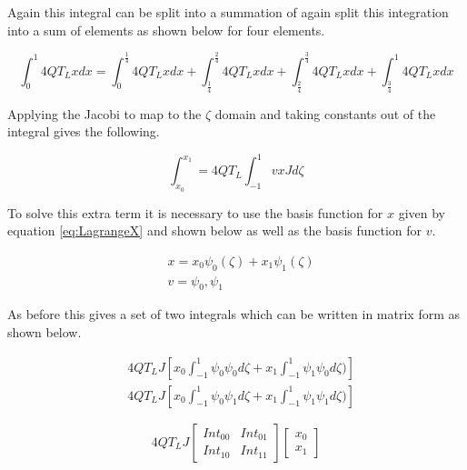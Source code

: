 \documentclass[11pt]{article}
\begin{document}
Again this integral can be split into a summation of  again split this integration into a sum of elements as shown below for four elements.

\begin{equation*}
\int_0^1 4QT_Lx dx = \int_0^\frac{1}{4} 4QT_Lx dx + \int_\frac{1}{4}^\frac{2}{4}4QT_Lx  dx + \int_\frac{2}{4}^\frac{3}{4}  4QT_Lx dx + \int_\frac{3}{4}^1 4QT_Lx dx
\end{equation*}



Applying the Jacobi to map to the $\zeta$ domain and taking constants out of the integral gives the following.

\begin{equation} \label{eq:LinSJ}
\int_{x_0}^{x_1} = 4QT_L\int_{-1}^1 vxJ d\zeta
\end{equation}

To solve this extra term it is necessary to use the basis function for $x$ given by equation \ref{eq:LagrangeX} and shown below as well as the basis function for $v$.

\begin{align*}
&x = x_{0}\psi_{0}(\zeta) + x_1\psi_{1}(\zeta) \\
&v = \psi_{0}, \psi_{1}
\end{align*}

As before this gives a set of two integrals which can be written in matrix form as shown below.


\begin{subequations}
\label{eq:linSsim}
\begin{align}
&4QT_LJ \left  [x_0 \int_{-1}^{1} \psi_{0} \psi_{0} d \zeta + x_1 \int_{-1}^{1} \psi_{1} \psi_{0} d\zeta ) \right ] \label{eq:linsrow1} \\
&4QT_LJ  \left  [x_0 \int_{-1}^{1} \psi_{0} \psi_{1} d \zeta + x_1 \int_{-1}^{1} \psi_{1} \psi_{1} d\zeta ) \right ]  \label{eq:linsrow2} 
\end{align}
\end{subequations}



\begin{equation} \label{eq:linSmatrix}
4QT_LJ 
\begin{bmatrix}

Int_{00} & Int_{01} \\
Int_{10} & Int_{11}
\end{bmatrix}
\begin{bmatrix}

x_{0} \\  x_{1} 
\end{bmatrix}
\end{equation}
\end{document}
